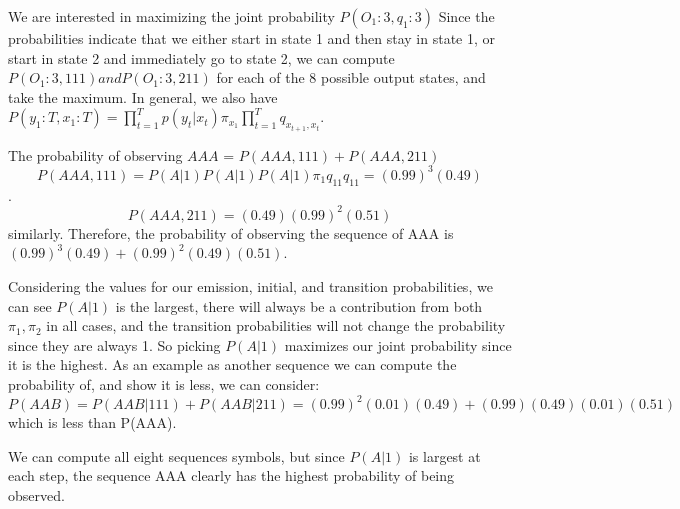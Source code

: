 \documentclass[11pt]{article}
\newcommand{\solution}[1]{{{\color{blue}{\bf Solution:} {#1}}}}
\begin{document}
\solution{
We are interested in maximizing the joint probability $P(O_1:3, q_1:3)$ Since the probabilities indicate that we either start in state 1 and then stay in state 1, or start in state 2 and immediately go to state 2, we can compute $P(O_1:3, 111) and P(O_1:3, 211)$ for each of the 8 possible output states, and take the maximum. 
In general, we also have $P(y_1:T, x_1:T) = \prod_{t=1}^{T} p(y_t | x_t) \pi_{x_1} \prod_{t=1}^{T}q_{x_{t+1}, x_t} $. 
\newline{}

The probability of observing $AAA$  = $P(AAA,111) + P(AAA,211)$ \[ P(AAA,111)= P(A | 1)P(A | 1)P(A | 1)\pi_1 q_{11} q_{11} = (0.99)^3(0.49)\]. \[P(AAA,211) = (0.49)(0.99)^2(0.51) \] similarly. 
Therefore, the probability of observing the sequence of AAA is $(0.99)^3(0.49) + (0.99)^2(0.49)(0.51)$. 

Considering the values for our emission, initial, and transition probabilities, we can see  $P(A | 1)$ is the largest, there will always be a contribution from both $\pi_1, \pi_2$ in all cases, and the transition probabilities will not change the probability since they are always 1. So picking $P(A | 1)$ maximizes our joint probability since it is the highest. As an example as another sequence we can compute the probability of, and show it is less, we can consider: 
\[ P(AAB) = P(AAB | 111) + P(AAB | 211) = (0.99)^2(0.01)(0.49) + (0.99)(0.49)(0.01)(0.51) \] which is less than P(AAA). 

We can compute all eight sequences symbols, but since $P(A | 1)$ is largest at each step, the sequence AAA clearly has the highest probability of being observed. 

}
\end{document}
